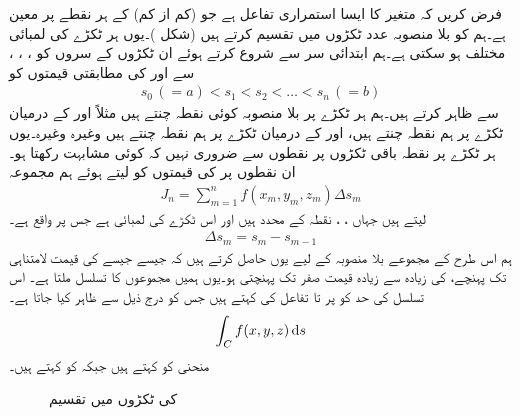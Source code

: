 فرض کریں کہ  متغیر  کا ایسا استمراری تفاعل ہے  جو (کم از کم)  کے ہر نقطے پر معین ہے۔ہم  کو بلا منصوبہ  عدد ٹکڑوں میں تقسیم کرتے ہیں (شکل )۔یوں ہر ٹکڑے کی لمبائی مختلف ہو سکتی ہے۔ہم ابتدائی سر سے شروع کرتے ہوئے ان ٹکڑوں کے سروں کو ، ، ،   سے اور  کی مطابقتی قیمتوں کو
\begin{align*}
s_0\,(=a)<s_1<s_2<\dots<s_n\,(=b)
\end{align*}
سے ظاہر کرتے ہیں۔ہم ہر ٹکڑے پر بلا منصوبہ کوئی نقطہ چنتے ہیں مثلاً  اور  کے درمیان ٹکڑے پر ہم نقطہ  چنتے ہیں،  اور  کے درمیان ٹکڑے پر ہم نقطہ  چنتے ہیں وغیرہ وغیرہ۔یوں ہر ٹکڑے پر نقطہ باقی ٹکڑوں پر نقطوں سے ضروری نہیں کہ کوئی مشابہت رکھتا ہو۔ ان نقطوں پر  کی قیمتوں کو لیتے ہوئے ہم مجموعہ
\begin{align}\label{مساوات_خطی_تکمل_تعریف_بطور_مجموعہ}
J_n=\sum_{m=1}^{n} f(x_m,y_m,z_m)\Delta s_m
\end{align}
لیتے ہیں جہاں ، ،  نقطہ  کے محدد ہیں اور  اس ٹکڑے کی لمبائی ہے جس پر  واقع ہے۔
\begin{align*}
\Delta s_m=s_m-s_{m-1}
\end{align*}
ہم اس طرح کے مجموعے بلا منصوبہ   کے لیے یوں حاصل کرتے ہیں کہ جیسے جیسے  کی قیمت لامتناہی تک پہنچے،  کی زیادہ سے زیادہ قیمت صفر تک پہنچتی ہو۔یوں ہمیں مجموعوں کا تسلسل  ملتا ہے۔ اس تسلسل کی حد کو  پر  تا  تفاعل  کی  کہتے ہیں جس کو درج ذیل سے ظاہر کیا جاتا ہے۔
\begin{align*}
\int_C f(x,y,z)\dif s
\end{align*}
منحنی  کو  کہتے ہیں جبکہ  کو  کہتے ہیں۔
%
\begin{figure}
\centering
{}
\caption{ کی ٹکڑوں میں تقسیم}
\label{شکل_سمتی_تکمل_راہ_کی_تقسیم}
\end{figure}

